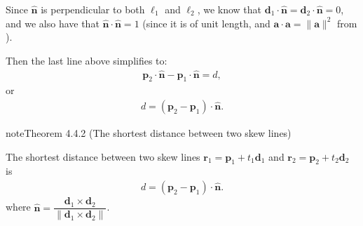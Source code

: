 \documentclass[letterpaper,10pt,english]{jupyterBook}
\begin{document}
\sphinxAtStartPar
Since \(\hat{\mathbf{n}}\) is perpendicular to both \(\ell_1\) and \(\ell_2\), we know that \(\mathbf{d}_1 \cdot \hat{\mathbf{n}} = \mathbf{d}_2 \cdot \hat{\mathbf{n}} = 0\), and we also have that \(\hat{\mathbf{n}} \cdot \hat{\mathbf{n}} = 1\) (since it is of unit length, and \(\mathbf{a} \cdot \mathbf{a} = \|\mathbf{a}\|^2\) from  ).

\sphinxAtStartPar
Then the last line above simplifies to:
\begin{equation*}
\begin{split} \mathbf{p}_2 \cdot \hat{\mathbf{n}} - \mathbf{p}_1 \cdot \hat{\mathbf{n}} = d, \end{split}
\end{equation*}
\sphinxAtStartPar
or
\begin{equation*}
\begin{split} d = (\mathbf{p}_2 - \mathbf{p}_1) \cdot \hat{\mathbf{n}}. \end{split}
\end{equation*}\label{_pages/4.3_Shortest_distance_problems:line-line-distance-theorem}
\begin{sphinxadmonition}{note}{Theorem 4.4.2 (The shortest distance between two skew lines)}



\sphinxAtStartPar
The shortest distance between two skew lines \(\mathbf{r}_1 = \mathbf{p}_1 + t_1 \mathbf{d}_1\) and \(\mathbf{r}_2 = \mathbf{p}_2 + t_2 \mathbf{d}_2\) is
\begin{equation}\label{equation:_pages/4.3_Shortest_distance_problems:line-line-distance-equation}
\begin{split} d = (\mathbf{p}_2 - \mathbf{p}_1) \cdot \hat{\mathbf{n}}.\end{split}
\end{equation}
\sphinxAtStartPar
where \(\hat{\mathbf{n}} = \dfrac{\mathbf{d}_1 \times \mathbf{d}_2}{\|\mathbf{d}_1 \times \mathbf{d}_2\|}\).
\end{sphinxadmonition}
\end{document}
